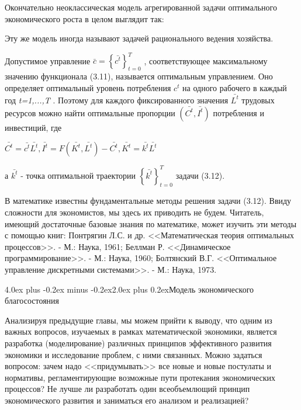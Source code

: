\documentclass[12pt, 4paper]{book}
\makeatletter
\renewcommand{\section}{\@startsection{section}{1}{1pt}%
	{4.0ex plus -0.2ex minus -0.2ex}{2.0ex plus 0.2ex}{\centering\bf}}%
\makeatother
\begin{document}
{Окончательно неоклассическая модель агрегированной задачи оптимального экономического роста в целом выглядит так:
\par

Эту же модель иногда называют задачей рационального ведения хозяйства.
\par

Допустимое управление $\bar{c}=\left\{\bar{c^t}\right\}_{t=0}^T$ , соответствующее максимальному значению функционала (3.11), называется оптимальным управлением. Оно определяет оптимальный уровень потребления $c^t$ на одного рабочего в каждый год \textit{t=1,...,T} . Поэтому для каждого фиксированного значения $\bar{L^t}$ трудовых ресурсов можно найти оптимальные пропорции $(\bar{C^t},\bar{I^t})$  потребления и инвестиций, где
\begin{center}
$\bar{C^t}=\bar{c^t}\bar{L^t}, \bar{I^t} =F(\bar{K^t},\bar{L^t}) - \bar{C^t}, \bar{K^t}=\bar{k^t}\bar{L^t} $
\end{center}
а $\bar{k^t}$ - точка оптимальной траектории $\left\{\bar{k^t}\right\}_{t=0}^T$ задачи (3.12).
\par

В математике известны фундаментальные методы решения задачи (3.12). Ввиду сложности для экономистов, мы здесь их приводить не будем. Читатель, имеющий достаточные базовые знания по математике, может изучить эти методы с помощью книг: Понтрягин Л.С. и др. <<Математическая теория оптимальных процессов>>. - М.: Наука, 1961; Беллман Р. <<Динамическое программирование>>. - М.: Наука, 1960; Болтянский В.Г. <<Оптимальное управление дискретными системами>>. - М.: Наука, 1973.
\newpage
\begin{center}
\section{Модель экономического благосостояния}
\end{center}
\par

Анализируя предыдущие главы, мы можем прийти к выводу, что одним из важных вопросов, изучаемых в рамках математической экономики, является разработка (моделирование) различных принципов эффективного развития экономики и исследование проблем, с ними связанных. Можно задаться вопросом: зачем надо <<придумывать>> все новые и новые постулаты и нормативы, регламентирующие возможные пути протекания экономических процессов? Не лучше ли разработать один всеобъемлющий принцип экономического развития и заниматься его анализом и реализацией?
\par

}
\end{document}
